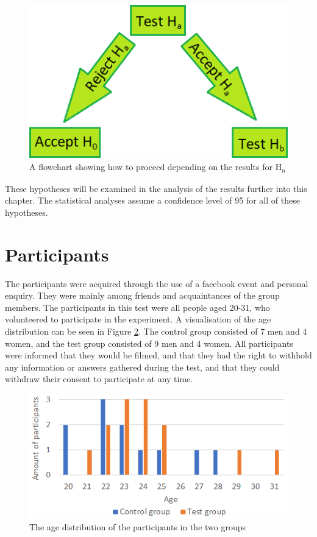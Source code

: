 \begin{figure}[h!]
  \centering
  \includegraphics[scale=0.4]{figures/hypo_flowchart.png}
  \caption{A flowchart showing how to proceed depending on the results for H\textsubscript{a}}\label{fig:hypo_flowchart}
\end{figure}

These hypotheses will be examined in the analysis of the results further into this chapter. The statistical analyses assume a confidence level of 95 for all of these hypotheses.

\section{Participants}
The participants were acquired through the use of a facebook event and personal enquiry. They were mainly among friends and acquaintances of the group members.  
The participants in this test were all people aged 20-31, who volunteered to participate in the experiment. A visualisation of the age distribution can be seen in Figure \ref{fig:age}. The control group consisted of 7 men and 4 women, and the test group consisted of 9 men and 4 women. All participants were informed that they would be filmed, and that they had the right to withhold any information or answers gathered during the test, and that they could withdraw their consent to participate at any time.

\begin{figure}[h!]
  \centering
  \includegraphics[scale=0.7]{figures/agedistribution.png}
  \caption{The age distribution of the participants in the two groups}\label{fig:age}
\end{figure}

